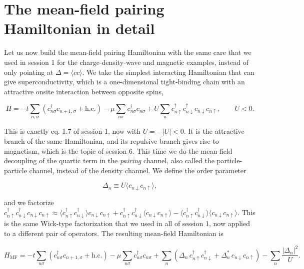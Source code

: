\section{The mean-field pairing Hamiltonian in detail}

Let us now build the mean-field pairing Hamiltonian with the same care that we used in session 1 for
the charge-density-wave and magnetic examples, instead of only pointing at $\Delta = \langle
cc\rangle$. We take the simplest interacting Hamiltonian that can give superconductivity, which is a
one-dimensional tight-binding chain with an attractive onsite interaction between opposite spins,

\begin{equation}
H = -t\sum_{n,\sigma}\left(c_{n\sigma}^\dagger c_{n+1,\sigma} + \text{h.c.}\right) - \mu\sum_{n\sigma}c_{n\sigma}^\dagger c_{n\sigma} + U\sum_n c_{n\uparrow}^\dagger c_{n\downarrow}^\dagger c_{n\downarrow} c_{n\uparrow}, \qquad U<0.
\end{equation}

This is exactly eq. 1.7 of session 1, now with $U = -|U| < 0$. It is the attractive branch of the
same Hamiltonian, and its repulsive branch gives rise to magnetism, which is the topic of session 6.
This time we do the mean-field decoupling of the quartic term in the \emph{pairing} channel, also
called the particle-particle channel, instead of the density channel. We define the order parameter

\begin{equation}
\Delta_n \equiv U\langle c_{n\downarrow}c_{n\uparrow}\rangle,
\end{equation}

and we factorize $c_{n\uparrow}^\dagger c_{n\downarrow}^\dagger c_{n\downarrow}c_{n\uparrow} \approx
\langle c_{n\uparrow}^\dagger c_{n\downarrow}^\dagger\rangle c_{n\downarrow}c_{n\uparrow} +
c_{n\uparrow}^\dagger c_{n\downarrow}^\dagger \langle c_{n\downarrow}c_{n\uparrow}\rangle - \langle
c_{n\uparrow}^\dagger c_{n\downarrow}^\dagger\rangle\langle c_{n\downarrow}c_{n\uparrow}\rangle$.
This is the same Wick-type factorization that we used in all of session 1, now applied to a
different pair of operators. The resulting mean-field Hamiltonian is

\begin{equation}
H_{\text{MF}} = -t\sum_{n\sigma}\left(c_{n\sigma}^\dagger c_{n+1,\sigma}+\text{h.c.}\right) - \mu\sum_{n\sigma}c_{n\sigma}^\dagger c_{n\sigma} + \sum_n\left(\Delta_n\, c_{n\uparrow}^\dagger c_{n\downarrow}^\dagger + \Delta_n^*\, c_{n\downarrow}c_{n\uparrow}\right) - \sum_n\frac{|\Delta_n|^2}{U}.
\end{equation}

